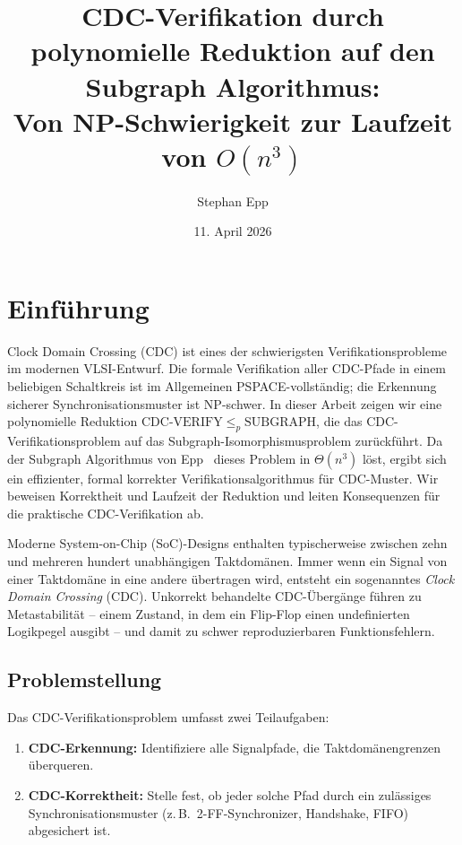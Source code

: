 ﻿\documentclass[a4paper,12pt]{article}
\title{{\bfseries CDC-Verifikation durch polynomielle Reduktion	auf den Subgraph Algorithmus}:\\
	{\Large Von NP-Schwierigkeit zur Laufzeit von  $O(n^3)$}}
\author{Stephan Epp}
\date{11. April 2026}
\theoremstyle{definition}
\begin{document}
	
	\maketitle	
	\tableofcontents
	\newpage
	
	\section{Einf\"uhrung}
	
	Clock Domain Crossing (CDC) ist eines der schwierigsten Verifikationsprobleme im modernen
	VLSI-Entwurf. Die formale Verifikation aller CDC-Pfade in einem beliebigen Schaltkreis
	ist im Allgemeinen PSPACE-vollst\"andig; die Erkennung sicherer Synchronisationsmuster
	ist NP-schwer. In dieser Arbeit zeigen wir eine polynomielle Reduktion
	$\mathrm{CDC\text{-}VERIFY} \leq_p \mathrm{SUBGRAPH}$, die das CDC-Verifikationsproblem
	auf das Subgraph-Isomorphismusproblem zur\"uckf\"uhrt. Da der Subgraph Algorithmus von
	Epp~\cite{epp2026subgraph} dieses Problem in $\Theta(n^3)$ l\"ost, ergibt sich ein
	effizienter, formal korrekter Verifikationsalgorithmus f\"ur CDC-Muster.
	Wir beweisen Korrektheit und Laufzeit der Reduktion und leiten Konsequenzen
	f\"ur die praktische CDC-Verifikation ab.
	
	Moderne System-on-Chip (SoC)-Designs enthalten typischerweise zwischen zehn und mehreren
	hundert unabh\"angigen Taktdom\"anen. Immer wenn ein Signal von einer Taktdom\"ane in
	eine andere \"ubertragen wird, entsteht ein sogenanntes \emph{Clock Domain Crossing}
	(CDC). Unkorrekt behandelte CDC-\"Uberg\"ange f\"uhren zu Metastabilit\"at -- einem
	Zustand, in dem ein Flip-Flop einen undefinierten Logikpegel ausgibt -- und damit zu
	schwer reproduzierbaren Funktionsfehlern.
	
	\subsection{Problemstellung}
	
	Das CDC-Verifikationsproblem umfasst zwei Teilaufgaben:
	\begin{enumerate}
		\item \textbf{CDC-Erkennung:} Identifiziere alle Signalpfade, die Taktdomänengrenzen
		über\-queren.
		\item \textbf{CDC-Korrektheit:} Stelle fest, ob jeder solche Pfad durch ein
		zulässiges Synchronisationsmuster (z.\,B.\ 2-FF-Synchronizer,
		Handshake, FIFO) abgesichert ist.
	\end{enumerate}
	
\end{document}
